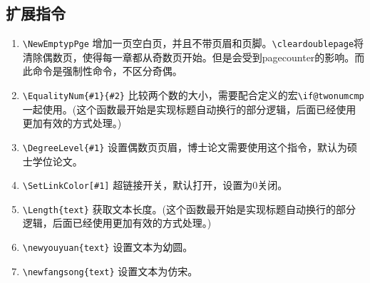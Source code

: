 \subsection{扩展指令}
\begin{tcolorbox}[colback=gray!10,
    colframe=black,
    width=16cm,
    arc=1mm, auto outer arc,
    boxrule=0.5pt,]
    
    \begin{enumerate}
        \item \verb|\NewEmptypPge| 增加一页空白页，并且不带页眉和页脚。\verb|\cleardoublepage|将清除偶数页，使得每一章都从奇数页开始。但是会受到pagecounter的影响。而此命令是强制性命令，不区分奇偶。
        \item \verb|\EqualityNum{#1}{#2}| 比较两个数的大小，需要配合定义的宏\verb|\if@twonumcmp|一起使用。(这个函数最开始是实现标题自动换行的部分逻辑，后面已经使用更加有效的方式处理。)
        \item \verb|\DegreeLevel{#1}| 设置偶数页页眉，博士论文需要使用这个指令，默认为硕士学位论文。
        \item \verb|\SetLinkColor[#1]| 超链接开关，默认打开，设置为$0$关闭。
        \item \verb|\Length{text}| 获取文本长度。(这个函数最开始是实现标题自动换行的部分逻辑，后面已经使用更加有效的方式处理。)
        \item \verb|\newyouyuan{text}| 设置文本为幼圆。
        \item \verb|\newfangsong{text}| 设置文本为仿宋。
        
    \end{enumerate}


\end{tcolorbox}



